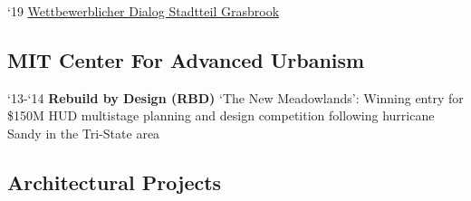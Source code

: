 \begin{tablist}
   \begin{tablist}

      \item[`19] \tab \href{https://www.dropbox.com/sh/ozudl0rm7s78xwp/AAC7h_isLyXeCMCgBAxboDrDa?dl=0}{Wettbewerblicher Dialog Stadtteil Grasbrook}
   \end{tablist}




\end{tablist}


\subsection*{MIT Center For Advanced Urbanism}



\begin{tablist}

   \item[`13-`14] \tab \textbf{Rebuild by Design (RBD)}
   {‘The New Meadowlands’: Winning entry for \$150M HUD multistage planning and design competition following hurricane Sandy in the Tri-State area}
\end{tablist}


\subsection*{Architectural Projects}


